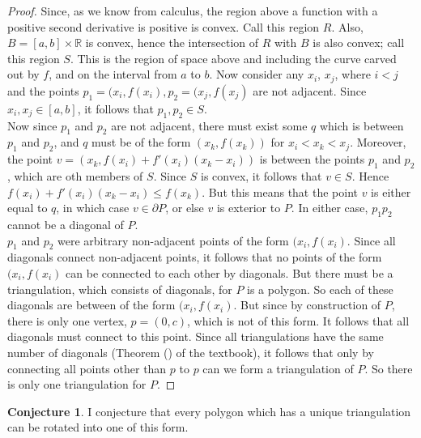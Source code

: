 \documentclass[12pt]{article}
\newcommand{\R}{\mathbb{R}}
\newcommand{\bndry}{\partial}
\theoremstyle{definition}
\newtheorem{conjecture}{Conjecture}
\begin{document}
\begin{proof}

Since, as we know from calculus, the region above a function with a positive second derivative is positive is convex. Call this region $R$. Also, $B = [a,b] \times \R$ is convex, hence the intersection of $R$ with $B$ is also convex; call this region $S$. This is the region of space above and including the curve carved out by $f$, and on the interval from $a$ to $b$. Now consider any $x_i$, $x_j$, where $i < j$ and the points $p_1 = (x_i, f(x_i),p_2 = (x_j, f(x_j)$ are not adjacent. Since $x_i,x_j\in [a,b]$, it follows that $p_1,p_2\in S$. \\

Now since $p_1$ and $p_2$ are not adjacent, there must exist some $q$ which is between $p_1$ and $p_2$, and $q$ must be of the form $(x_k, f(x_k))$ for $x_i < x_k < x_j$. Moreover, the point $v = (x_k, f(x_i) + f'(x_i)(x_k - x_i) )$ is between the points $p_1$ and $p_2$, which are oth members of $S$. Since $S$ is convex, it follows that $v\in S$. Hence $f(x_i) + f'(x_i)(x_k - x_i) \le f(x_k)$. But this means that the point $v$ is either equal to $q$, in which case $v \in \bndry P$, or else $v$ is exterior to $P$. In either case, $p_1p_2$ cannot be a diagonal of $P$. \\

$p_1$ and $p_2$ were arbitrary non-adjacent points of the form $(x_i, f(x_i)$. Since all diagonals connect non-adjacent points, it follows that no points of the form $(x_i, f(x_i)$ can be connected to each other by diagonals. But there must be a triangulation, which consists of diagonals, for $P$ is a polygon. So each of these diagonals are between of the form $(x_i, f(x_i)$. But since by construction of $P$, there is only one vertex, $p = (0,c) $, which is not of this form. It follows that all diagonals must connect to this point. Since all triangulations have the same number of diagonals (Theorem () of the textbook), it follows that only by connecting all points other than $p$ to $p$ can we form a triangulation of $P$. So there is only one triangulation for $P$.
\end{proof}


\begin{conjecture}

I conjecture that every polygon which has a unique triangulation can be rotated into one of this form.
\end{conjecture}
\end{document}
